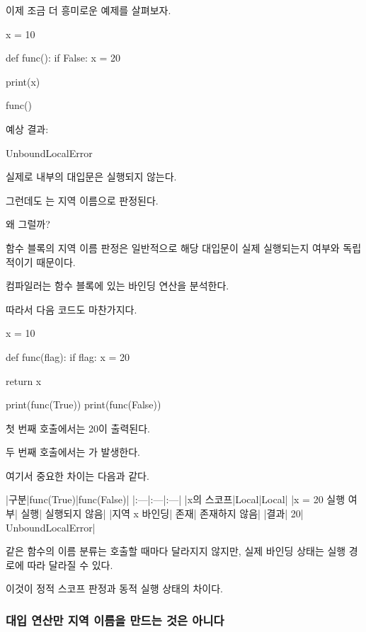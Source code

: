 이제 조금 더 흥미로운 예제를 살펴보자.

\begin{dhkcode}
x = 10

def func():
    if False:
        x = 20

    print(x)

func()
\end{dhkcode}

예상 결과:

\begin{dhkzsh}
UnboundLocalError
\end{dhkzsh}

실제로  내부의 대입문은 실행되지 않는다.

그런데도 는 지역 이름으로 판정된다.

왜 그럴까?

함수 블록의 지역 이름 판정은 일반적으로 해당 대입문이 실제 실행되는지 여부와 독립적이기 때문이다.

컴파일러는 함수 블록에 있는 바인딩 연산을 분석한다.

따라서 다음 코드도 마찬가지다.

\begin{dhkcode}
x = 10

def func(flag):
    if flag:
        x = 20

    return x

print(func(True))
print(func(False))
\end{dhkcode}

첫 번째 호출에서는 20이 출력된다.

두 번째 호출에서는 가 발생한다.

여기서 중요한 차이는 다음과 같다.

\begin{dhktable}
|구분|func(True)|func(False)|
|:---|:---|:---|
|x의 스코프|Local|Local|
|x = 20 실행 여부|	실행|	실행되지 않음|
|지역 x 바인딩|	존재|	존재하지 않음|
|결과|	20|	UnboundLocalError|
\end{dhktable}

같은 함수의 이름 분류는 호출할 때마다 달라지지 않지만, 실제 바인딩 상태는 실행 경로에 따라 달라질 수 있다.

이것이 정적 스코프 판정과 동적 실행 상태의 차이다.

\subsubsection{대입 연산만 지역 이름을 만드는 것은 아니다}

